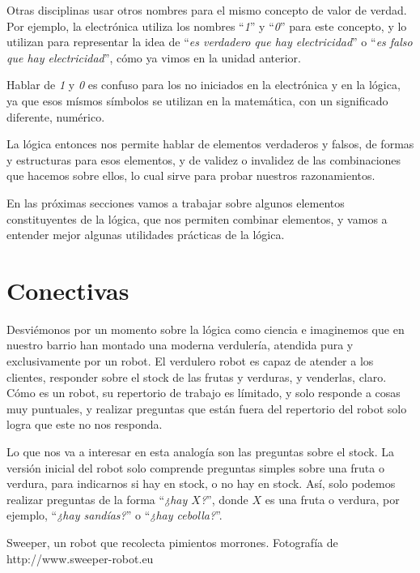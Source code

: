 \begin{knowwhat}
Otras disciplinas usar otros nombres para el mismo concepto de valor de verdad.
Por ejemplo, la electrónica utiliza los nombres ``\textit{1}'' y ``\textit{0}''
para este concepto, y lo utilizan para representar la idea de ``\textit{es
verdadero que hay electricidad}'' o ``\textit{es falso que hay electricidad}'',
cómo ya vimos en la unidad anterior.

Hablar de \textit{1} y \textit{0} es confuso para los no iniciados en la
electrónica y en la lógica, ya que esos mísmos símbolos se utilizan en la
matemática, con un significado diferente, numérico.
\end{knowwhat}

La lógica entonces nos permite hablar de elementos verdaderos y falsos, de
formas y estructuras para esos elementos, y de validez o invalidez de las
combinaciones que hacemos sobre ellos, lo cual sirve para probar nuestros
razonamientos.

En las próximas secciones vamos a trabajar sobre algunos elementos
constituyentes de la lógica, que nos permiten combinar elementos, y vamos a
entender mejor algunas utilidades prácticas de la lógica.

\section{Conectivas}
\label{chap:logica:sec:conectivas}

Desviémonos por un momento sobre la lógica como ciencia e imaginemos que en
nuestro barrio han montado una moderna verdulería, atendida pura y
exclusivamente por un robot. El verdulero robot es capaz de atender a los
clientes, responder sobre el stock de las frutas y verduras, y venderlas, claro.
Cómo es un robot, su repertorio de trabajo es límitado, y solo responde a cosas
muy puntuales, y realizar preguntas que están fuera del repertorio del robot
solo logra que este no nos responda.

Lo que nos va a interesar en esta analogía son las preguntas sobre el stock. La
versión inicial del robot solo comprende preguntas simples sobre una fruta o
verdura, para indicarnos si hay en stock, o no hay en stock. Así, solo podemos
realizar preguntas de la forma ``\textit{¿hay $X$?}'', donde $X$ es una fruta o
verdura, por ejemplo, ``\textit{¿hay sandías?}'' o ``\textit{¿hay cebolla?}''.

{Sweeper, un robot que recolecta pimientos morrones.} {Fotografía de
http://www.sweeper-robot.eu}

